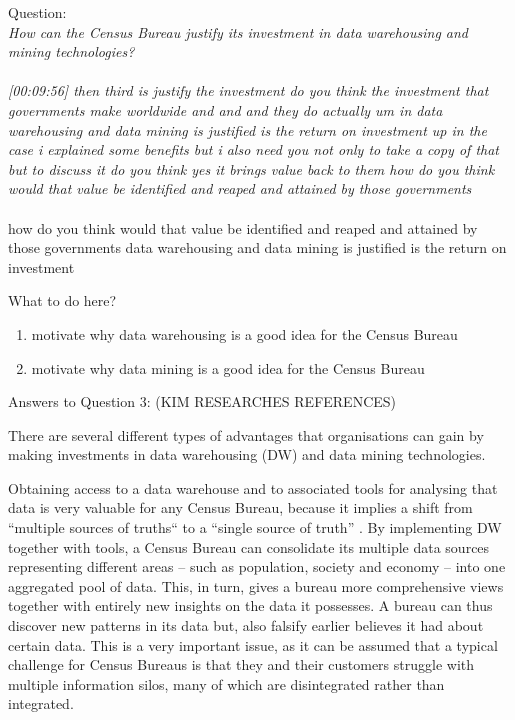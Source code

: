 Question:\\
\emph{
    How can the Census Bureau justify its investment in data warehousing and mining
technologies?
}\\\\

\emph{[00:09:56] then third is justify the investment do you think the investment that governments make worldwide
and and and they do actually um in data warehousing and data mining is justified is the return on investment
up in the case i explained some benefits but i also need you not only to take a copy of that but
to discuss it do you think yes it brings value back to them how do you think would that value be
identified and reaped and attained by those governments}\\\\
how do you think would that value be
identified and reaped and attained by those governments
data warehousing and data mining is justified is the return on investment

What to do here?
\begin{enumerate}
    \item motivate why data warehousing is a good idea for the Census Bureau
    \item motivate why data mining is a good idea for the Census Bureau
  \end{enumerate}

\newpage Answers to Question 3: (KIM RESEARCHES REFERENCES)

There are several different types of advantages that organisations can gain by making investments in data warehousing (DW) and data mining technologies.

Obtaining access to a data warehouse and to associated tools for analysing that data is very valuable for any Census Bureau, 
because it implies a shift from “multiple sources of truths“ to a “single source of truth” \cite{l2video}. 
By implementing DW together with tools, a Census Bureau can consolidate its multiple data sources representing different areas -- 
such as population, society and economy -- into one aggregated pool of data. 
This, in turn, gives a bureau more comprehensive views together with entirely new insights on the data it possesses. 
A bureau can thus discover new patterns in its data but, also falsify earlier believes it had about certain data. 
This is a very important issue, 
as it can be assumed that a typical challenge for Census Bureaus is that they and their customers struggle with multiple information silos, 
many of which are disintegrated rather than integrated.

